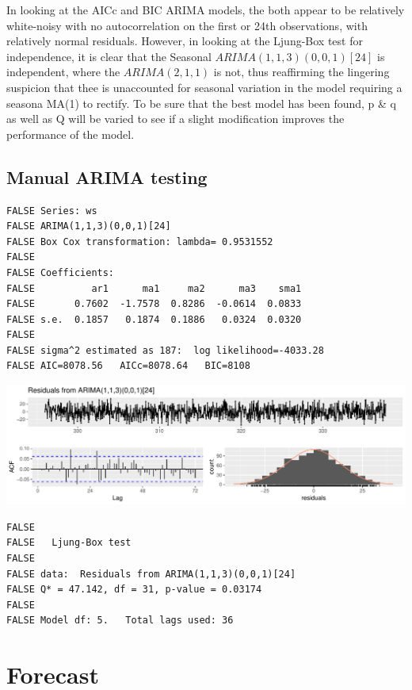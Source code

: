 \documentclass[openany]{book}
\begin{document}
In looking at the AICc and BIC ARIMA models, the both appear to be
relatively white-noisy with no autocorrelation on the first or 24th
observations, with relatively normal residuals. However, in looking at
the Ljung-Box test for independence, it is clear that the Seasonal
\(ARIMA (1,1,3)(0,0,1)[24]\) is independent, where the \(ARIMA(2,1,1)\)
is not, thus reaffirming the lingering suspicion that thee is
unaccounted for seasonal variation in the model requiring a seasona
MA(1) to rectify. To be sure that the best model has been found, p \& q
as well as Q will be varied to see if a slight modification improves the
performance of the model.

\hypertarget{manual-arima-testing}{%
\subsection{Manual ARIMA testing}\label{manual-arima-testing}}

\begin{verbatim}
FALSE Series: ws 
FALSE ARIMA(1,1,3)(0,0,1)[24] 
FALSE Box Cox transformation: lambda= 0.9531552 
FALSE 
FALSE Coefficients:
FALSE          ar1      ma1     ma2      ma3    sma1
FALSE       0.7602  -1.7578  0.8286  -0.0614  0.0833
FALSE s.e.  0.1857   0.1874  0.1886   0.0324  0.0320
FALSE 
FALSE sigma^2 estimated as 187:  log likelihood=-4033.28
FALSE AIC=8078.56   AICc=8078.64   BIC=8108
\end{verbatim}

\includegraphics{Group2_Project1_Fall2019_files/figure-latex/unnamed-chunk-22-1.pdf}

\begin{verbatim}
FALSE 
FALSE   Ljung-Box test
FALSE 
FALSE data:  Residuals from ARIMA(1,1,3)(0,0,1)[24]
FALSE Q* = 47.142, df = 31, p-value = 0.03174
FALSE 
FALSE Model df: 5.   Total lags used: 36
\end{verbatim}

\hypertarget{forecast-2}{%
\section{Forecast}\label{forecast-2}}
\end{document}
